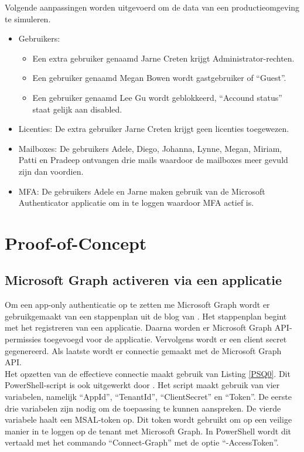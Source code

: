 Volgende aanpassingen worden uitgevoerd om de data van een productieomgeving te simuleren.

\begin{itemize}
    \item Gebruikers: 
    \begin{itemize}
        \item Een extra gebruiker genaamd Jarne Creten krijgt Administrator-rechten.
        \item Een gebruiker genaamd Megan Bowen wordt gastgebruiker of “Guest”.
        \item Een gebruiker genaamd Lee Gu wordt geblokkeerd, “Accound status” staat gelijk aan disabled.
    \end{itemize}
    \item Licenties: De extra gebruiker Jarne Creten krijgt geen licenties toegewezen.
    \item Mailboxes: De gebruikers Adele, Diego, Johanna, Lynne, Megan, Miriam, Patti en Pradeep ontvangen drie mails waardoor de mailboxes meer gevuld zijn dan voordien.
    \item \ac{MFA}: De gebruikers Adele en Jarne maken gebruik van de Microsoft Authenticator applicatie om in te loggen waardoor \ac{MFA} actief is.
\end{itemize}

\section{Proof-of-Concept}

\subsection{Microsoft Graph activeren via een applicatie}


Om een app-only authenticatie op te zetten me Microsoft Graph wordt er gebruikgemaakt van een stappenplan uit de blog van \textcite{Terlisten2022}. Het stappenplan begint met het registreren van een applicatie. Daarna worden er Microsoft Graph \Ac{API}-permissies toegevoegd voor de applicatie. Vervolgens wordt er een client secret gegenereerd. Als laatste wordt er connectie gemaakt met de Microsoft Graph \Ac{API}. \\

Het opzetten van de effectieve connectie maakt gebruik van Listing \ref{PSQ0}. Dit PowerShell-script is ook uitgewerkt door \textcite{Terlisten2022}. Het script maakt gebruik van vier variabelen, namelijk “AppId”, “TenantId”, “ClientSecret” en “Token”. De eerste drie variabelen zijn nodig om de toepassing te kunnen aanspreken. De vierde variabele haalt een \ac{MSAL}-token op. Dit token wordt gebruikt om op een veilige manier in te loggen op de tenant met Microsoft Graph. In PowerShell wordt dit vertaald met het commando “Connect-Graph” met de optie “-AccessToken”. \\

